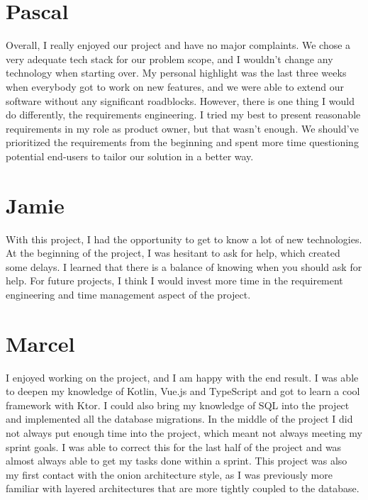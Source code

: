 \section{Pascal}
Overall, I really enjoyed our project and have no major complaints.
We chose a very adequate tech stack for our problem scope, and I wouldn't change any technology when starting over.
My personal highlight was the last three weeks when everybody got to work on new features, and we were able to extend our software without any significant roadblocks.
However, there is one thing I would do differently, the requirements engineering.
I tried my best to present reasonable requirements in my role as product owner, but that wasn't enough.
We should've prioritized the requirements from the beginning and spent more time questioning potential end-users to tailor our solution in a better way.

\section{Jamie}
With this project, I had the opportunity to get to know a lot of new technologies.
At the beginning of the project, I was hesitant to ask for help, which created some delays.
I learned that there is a balance of knowing when you should ask for help.
For future projects, I think I would invest more time in the requirement engineering and time management aspect of the project.

\section{Marcel}
I enjoyed working on the project, and I am happy with the end result.
I was able to deepen my knowledge of Kotlin, Vue.js and TypeScript and got to learn a cool framework with Ktor.
I could also bring my knowledge of SQL into the project and implemented all the database migrations.
In the middle of the project I did not always put enough time into the project, which meant not always meeting my sprint goals.
I was able to correct this for the last half of the project and was almost always able to get my tasks done within a sprint.
This project was also my first contact with the onion architecture style, as I was previously more familiar with layered architectures that are more tightly coupled to the database.
